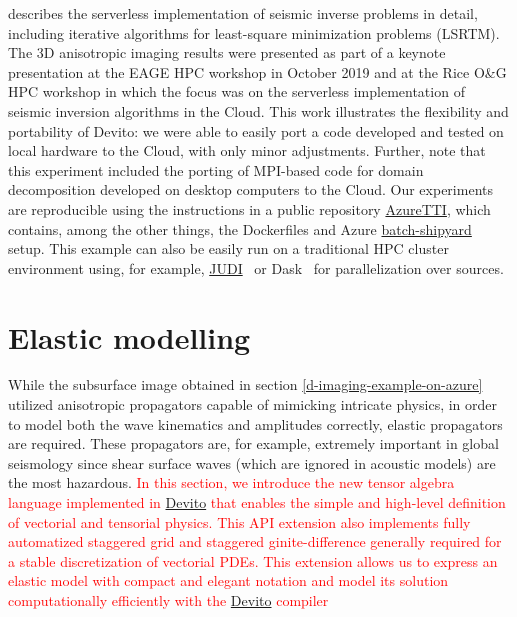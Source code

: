 \documentclass[10pt, conference]{IEEEtran}
\newcommand{\devito}{\href{https://github.com/devitocodes/devito}{Devito} }
\begin{document}
\cite{witte2019TPDedas} describes the serverless implementation of seismic
inverse problems in detail, including iterative algorithms for least-square
minimization problems (LSRTM). The 3D anisotropic imaging results were presented
as part of a keynote presentation at the EAGE HPC workshop in October 2019
\cite{herrmann2019EAGEHPCaii} and at the Rice O\&G HPC workshop
\cite{witte2019RHPCssi} in which the focus was on the serverless implementation
of seismic inversion algorithms in the Cloud. This work illustrates the
flexibility and portability of Devito: we were able to easily port a code
developed and tested on local hardware to the Cloud, with only minor
adjustments. Further, note that this experiment included the porting of
MPI-based code for domain decomposition developed on desktop computers to the
Cloud. Our experiments are reproducible using the instructions in a public
repository \href{https://github.com/slimgroup/Azure2019/tree/v1.0}{AzureTTI}, which
contains, among the other things, the Dockerfiles and Azure
\href{https://batch-shipyard.readthedocs.io}{batch-shipyard} setup. This example
can also be easily run on a traditional HPC cluster environment using, for example, 
\href{https://github.com/slimgroup/JUDI.jl}{JUDI}~\cite{witte2018alf} or Dask~\cite{dask}
for parallelization over sources.

\section{Elastic modelling}\label{elastic-modelling}

While the subsurface image obtained in section \ref{d-imaging-example-on-azure}
utilized anisotropic propagators capable of mimicking intricate physics, in order
to model both the wave kinematics and amplitudes correctly, elastic
propagators are required. These propagators are, for example, extremely
important in global seismology since shear surface waves (which are
ignored in acoustic models) are the most hazardous. \textcolor{red}{In this section, we 
introduce the new tensor algebra language implemented in \devito that enables the simple and 
high-level definition of vectorial and tensorial physics. This API extension also implements 
fully automatized staggered grid and staggered ginite-difference generally required for a stable discretization
of vectorial PDEs. This extension allows us to express an elastic model with compact and elegant notation 
and model its solution computationally efficiently with the \devito compiler}
\end{document}
